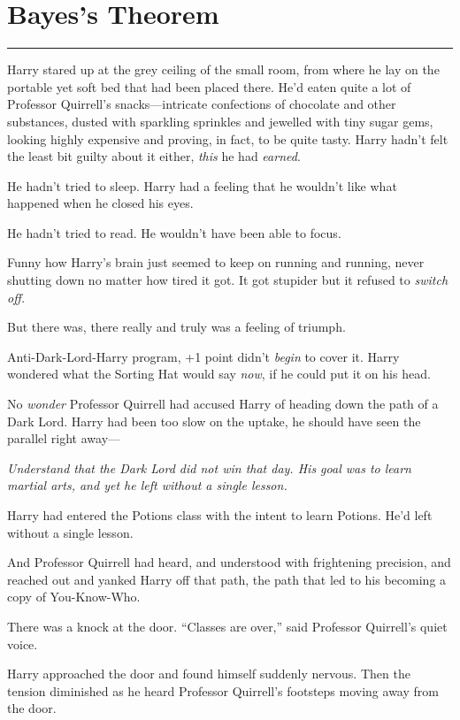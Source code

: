 \chapter{Bayes's Theorem}\label{bayess-theorem}

\begin{center}\rule{3in}{0.4pt}\end{center}

Harry stared up at the grey ceiling of the small room, from where he lay
on the portable yet soft bed that had been placed there. He'd eaten
quite a lot of Professor Quirrell's snacks---intricate confections of
chocolate and other substances, dusted with sparkling sprinkles and
jewelled with tiny sugar gems, looking highly expensive and proving, in
fact, to be quite tasty. Harry hadn't felt the least bit guilty about it
either, \emph{this} he had \emph{earned}.

He hadn't tried to sleep. Harry had a feeling that he wouldn't like what
happened when he closed his eyes.

He hadn't tried to read. He wouldn't have been able to focus.

Funny how Harry's brain just seemed to keep on running and running,
never shutting down no matter how tired it got. It got stupider but it
refused to \emph{switch off.}

But there was, there really and truly was a feeling of triumph.

Anti-Dark-Lord-Harry program, +1 point didn't \emph{begin} to cover it.
Harry wondered what the Sorting Hat would say \emph{now}, if he could
put it on his head.

No \emph{wonder} Professor Quirrell had accused Harry of heading down
the path of a Dark Lord. Harry had been too slow on the uptake, he
should have seen the parallel right away---

\emph{Understand that the Dark Lord did not win that day. His goal was
to learn martial arts, and yet he left without a single lesson.}

Harry had entered the Potions class with the intent to learn Potions.
He'd left without a single lesson.

And Professor Quirrell had heard, and understood with frightening
precision, and reached out and yanked Harry off that path, the path that
led to his becoming a copy of You-Know-Who.

There was a knock at the door. ``Classes are over,'' said Professor
Quirrell's quiet voice.

Harry approached the door and found himself suddenly nervous. Then the
tension diminished as he heard Professor Quirrell's footsteps moving
away from the door.

